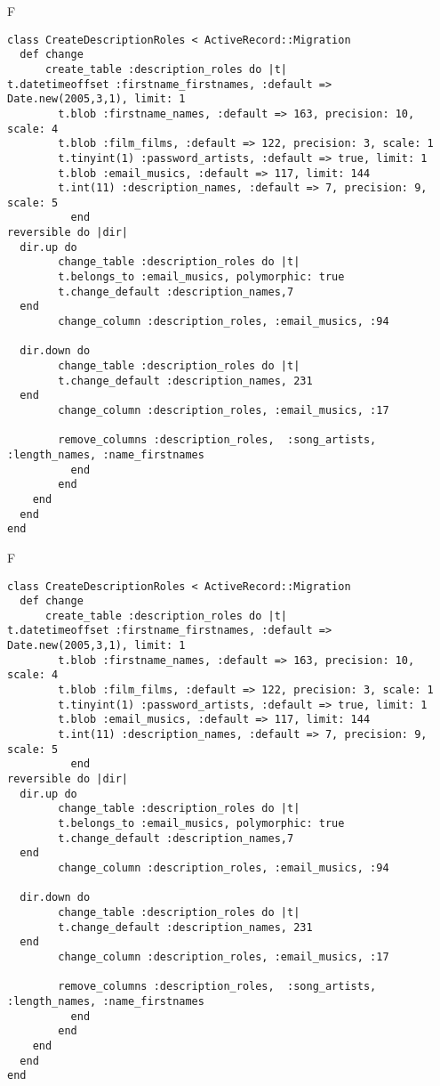 F
\begin{verbatim}
class CreateDescriptionRoles < ActiveRecord::Migration
  def change
	  create_table :description_roles do |t|
t.datetimeoffset :firstname_firstnames, :default => Date.new(2005,3,1), limit: 1
		t.blob :firstname_names, :default => 163, precision: 10, scale: 4
		t.blob :film_films, :default => 122, precision: 3, scale: 1
		t.tinyint(1) :password_artists, :default => true, limit: 1
		t.blob :email_musics, :default => 117, limit: 144
		t.int(11) :description_names, :default => 7, precision: 9, scale: 5
		  end
reversible do |dir|
  dir.up do
		change_table :description_roles do |t|
		t.belongs_to :email_musics, polymorphic: true
 		t.change_default :description_names,7
  end
 		change_column :description_roles, :email_musics, :94
   
  dir.down do
		change_table :description_roles do |t|
		t.change_default :description_names, 231
  end
 		change_column :description_roles, :email_musics, :17
   
		remove_columns :description_roles,  :song_artists, :length_names, :name_firstnames 
	      end
	    end
    end 
  end
end

\end{verbatim}

F
\begin{verbatim}
class CreateDescriptionRoles < ActiveRecord::Migration
  def change
	  create_table :description_roles do |t|
t.datetimeoffset :firstname_firstnames, :default => Date.new(2005,3,1), limit: 1
		t.blob :firstname_names, :default => 163, precision: 10, scale: 4
		t.blob :film_films, :default => 122, precision: 3, scale: 1
		t.tinyint(1) :password_artists, :default => true, limit: 1
		t.blob :email_musics, :default => 117, limit: 144
		t.int(11) :description_names, :default => 7, precision: 9, scale: 5
		  end
reversible do |dir|
  dir.up do
		change_table :description_roles do |t|
		t.belongs_to :email_musics, polymorphic: true
 		t.change_default :description_names,7
  end
 		change_column :description_roles, :email_musics, :94
   
  dir.down do
		change_table :description_roles do |t|
		t.change_default :description_names, 231
  end
 		change_column :description_roles, :email_musics, :17
   
		remove_columns :description_roles,  :song_artists, :length_names, :name_firstnames 
	      end
	    end
    end 
  end
end

\end{verbatim}

